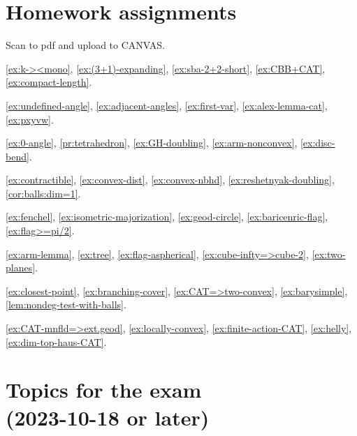\chapter*{Homework assignments}

Scan to pdf and upload to CANVAS.

\ref{ex:k-><mono},
\ref{ex:(3+1)-expanding},
\ref{ex:sba-2+2-short},
\ref{ex:CBB+CAT},
\ref{ex:compact-length}.

\ref{ex:undefined-angle},
\ref{ex:adjacent-angles},
\ref{ex:first-var},
\ref{ex:alex-lemma-cat},
\ref{ex:pxyvw}.

\ref{ex:0-angle},
\ref{pr:tetrahedron},
\ref{ex:GH-doubling},
\ref{ex:arm-nonconvex},
\ref{ex:disc-bend}.

\ref{ex:contractible},
\ref{ex:convex-dist},
\ref{ex:convex-nbhd},
\ref{ex:reshetnyak-doubling},
\ref{cor:balls:dim=1}.

\ref{ex:fenchel},
\ref{ex:isometric-majorization},
\ref{ex:geod-circle},
\ref{ex:baricenric-flag},
\ref{ex:flag>=pi/2}.

\ref{ex:arm-lemma},
\ref{ex:tree},
\ref{ex:flag-aspherical},
\ref{ex:cube-infty=>cube-2},
\ref{ex:two-planes}.

\ref{ex:closest-point},
\ref{ex:branching-cover},
\ref{ex:CAT=>two-convex},
\ref{ex:barysimple},
\ref{lem:nondeg-test-with-balls}.

\ref{ex:CAT-mnfld=>ext.geod},
\ref{ex:locally-convex},
\ref{ex:finite-action-CAT},
\ref{ex:helly},
\ref{ex:dim-top-haus-CAT}.


\newpage

\chapter*{Topics for the exam\\ (2023-10-18
or later)}

